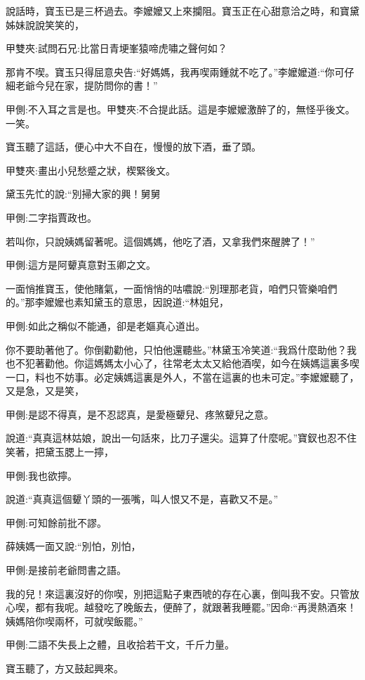 \begin{parag}
    說話時，寶玉已是三杯過去。李嬤嬤又上來攔阻。寶玉正在心甜意洽之時，和寶黛姊妹說說笑笑的，\begin{note}甲雙夾:試問石兄:比當日青埂峯猿啼虎嘯之聲何如？\end{note}那肯不喫。寶玉只得屈意央告:“好媽媽，我再喫兩鍾就不吃了。”李嬤嬤道:“你可仔細老爺今兒在家，提防問你的書！”\begin{note}甲側:不入耳之言是也。甲雙夾:不合提此話。這是李嬤嬤激醉了的，無怪乎後文。一笑。\end{note}寶玉聽了這話，便心中大不自在，慢慢的放下酒，垂了頭。\begin{note}甲雙夾:畫出小兒愁蹙之狀，楔緊後文。\end{note}黛玉先忙的說:“別掃大家的興！舅舅\begin{note}甲側:二字指賈政也。\end{note}若叫你，只說姨媽留著呢。這個媽媽，他吃了酒，又拿我們來醒脾了！”\begin{note}甲側:這方是阿顰真意對玉卿之文。\end{note}一面悄推寶玉，使他賭氣，一面悄悄的咕噥說:“別理那老貨，咱們只管樂咱們的。”那李嬤嬤也素知黛玉的意思，因說道:“林姐兒，\begin{note}甲側:如此之稱似不能通，卻是老嫗真心道出。\end{note}你不要助著他了。你倒勸勸他，只怕他還聽些。”林黛玉冷笑道:“我爲什麼助他？我也不犯著勸他。你這媽媽太小心了，往常老太太又給他酒喫，如今在姨媽這裏多喫一口，料也不妨事。必定姨媽這裏是外人，不當在這裏的也未可定。”李嬤嬤聽了，又是急，又是笑，\begin{note}甲側:是認不得真，是不忍認真，是愛極顰兒、疼煞顰兒之意。\end{note}說道:“真真這林姑娘，說出一句話來，比刀子還尖。這算了什麼呢。”寶釵也忍不住笑著，把黛玉腮上一擰，\begin{note}甲側:我也欲擰。\end{note}說道:“真真這個顰丫頭的一張嘴，叫人恨又不是，喜歡又不是。”\begin{note}甲側:可知餘前批不謬。\end{note}薛姨媽一面又說:“別怕，別怕，\begin{note}甲側:是接前老爺問書之語。\end{note}我的兒！來這裏沒好的你喫，別把這點子東西唬的存在心裏，倒叫我不安。只管放心喫，都有我呢。越發吃了晚飯去，便醉了，就跟著我睡罷。”因命:“再燙熱酒來！姨媽陪你喫兩杯，可就喫飯罷。”\begin{note}甲側:二語不失長上之體，且收拾若干文，千斤力量。\end{note}寶玉聽了，方又鼓起興來。
\end{parag}


